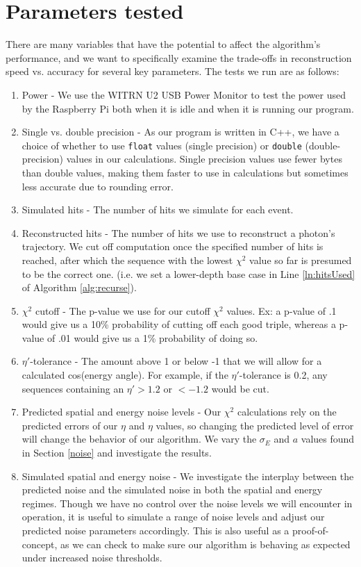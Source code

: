 \section{Parameters tested} \label{vars}
There are many variables that have the potential to affect the algorithm's performance, and we want to specifically examine the trade-offs in reconstruction speed vs. accuracy for several key parameters. The tests we run are as follows:

\begin{enumerate}
    \item Power - We use the WITRN U2 USB Power Monitor\cite{WITRN} to test the power used by the Raspberry Pi both when it is idle and when it is running our program.
    \item Single vs. double precision - As our program is written in C++, we have a choice of whether to use \texttt{float} values (single precision) or \texttt{double} (double-precision) values in our calculations. Single precision values use fewer bytes than double values, making them faster to use in calculations but sometimes less accurate due to rounding error.
    \item Simulated hits - The number of hits we simulate for each event.
    \item Reconstructed hits - The number of hits we use to reconstruct a photon's trajectory. We cut off computation once the specified number of hits is reached, after which the sequence with the lowest $\chi^2$ value so far is presumed to be the correct one. (i.e. we set a lower-depth base case in Line \ref{ln:hitsUsed} of Algorithm \ref{alg:recurse}).
    \item $\chi^2$ cutoff - The p-value we use for our cutoff $\chi^2$ values. Ex: a p-value of .1 would give us a 10\% probability of cutting off each good triple, whereas a p-value of .01 would give us a 1\% probability of doing so.
    \item $\eta'$-tolerance - The amount above 1 or below -1 that we will allow for a calculated cos(energy angle). For example, if the $\eta'$-tolerance is 0.2, any sequences containing an $\eta' > 1.2$ or $< -1.2$ would be cut.
    \item Predicted spatial and energy noise levels - Our $\chi^2$ calculations rely on the predicted errors of our $\eta$ and $\eta$ values, so changing the predicted level of error will change the behavior of our algorithm. We vary the $\sigma_E$ and $a$ values found in Section \ref{noise} and investigate the results.
    \item Simulated spatial and energy noise - We investigate the interplay between the predicted noise and the simulated noise in both the spatial and energy regimes. Though we have no control over the noise levels we will encounter in operation, it is useful to simulate a range of noise levels and adjust our predicted noise parameters accordingly. This is also useful as a proof-of-concept, as we can check to make sure our algorithm is behaving as expected under increased noise thresholds.
\end{enumerate}